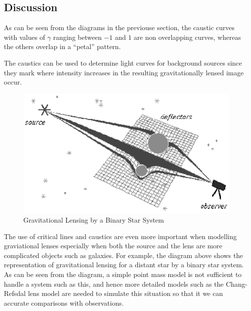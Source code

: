 \documentclass[a4paper]{IEEEtran}
\newcommand{\showcode}[1]{\begin{mdframed}[style=code] %
                          \end{mdframed}%
}
\newcommand{\showccode}[1]{\begin{mdframed}[style=code] %
                          \end{mdframed}%
}
\begin{document}
    \subsection{Discussion}
    As can be seen from the diagrams in the previouse section, 
    the caustic curves with values of $\gamma$ ranging between
    $-1$ and $1$ are non overlapping curves, whereas the others
    overlap in a ``petal'' pattern.

    The caustics can be used to determine light curves for background
    sources since they mark where intensity increases in the resulting
    gravitationally lensed image occur.

    \begin{figure}
        \caption{Gravitational Lensing by a Binary Star System}
        \label{fig:binary-star} 
        \begin{center}
            \includegraphics[width=\columnwidth]{images/lens_model.eps}
        \end{center}
    \end{figure}

    The use of critical lines and caustics are even more important
    when modelling graviational lenses especially when both the source
    and the lens are more complicated objects such as galaxies.
    For example, the diagram above shows the representation of 
    gravitational lensing for a distant star by a binary star system.
    As can be seen from the diagram, a simple point mass model is
    not sufficient to handle a system such as this, and hence
    more detailed models such as the Chang-Refsdal lens model
    are needed to simulate this situation so that it we can accurate
    comparisons with observations.


\onecolumn

\showcode{src/caustics.f} 

\showcode{src/lense.f} 

\showccode{src/image.c}

\end{document}
